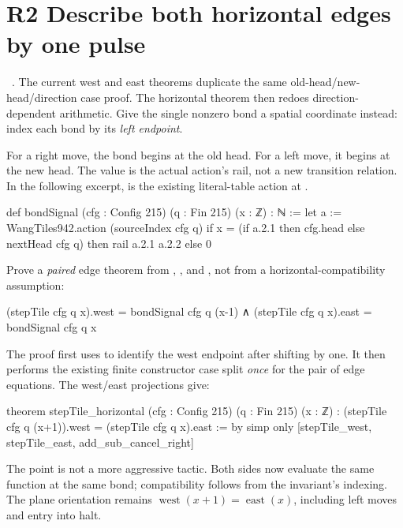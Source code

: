 \section{R2 Describe both horizontal edges by one pulse}

\ . The current west and east theorems duplicate the same old-head/new-head/direction case proof. The horizontal theorem then redoes direction-dependent arithmetic. Give the single nonzero bond a spatial coordinate instead: index each bond by its \emph{left endpoint}.

For a right move, the bond begins at the old head. For a left move, it begins at the new head. The value is the actual action's rail, not a new transition relation. In the following excerpt,  is the existing literal-table action at .

\begin{Lean}
def bondSignal (cfg : Config 215) (q : Fin 215) (x : ℤ) : ℕ :=
  let a := WangTiles942.action (sourceIndex cfg q)
  if x = (if a.2.1 then cfg.head else nextHead cfg q)
    then rail a.2.1 a.2.2 else 0
\end{Lean}

Prove a \emph{paired} edge theorem from , , and , not from a horizontal-compatibility assumption:

\begin{Lean}
  (stepTile cfg q x).west = bondSignal cfg q (x-1) ∧
    (stepTile cfg q x).east = bondSignal cfg q x
\end{Lean}

The proof first uses  to identify the west endpoint after shifting by one. It then performs the existing finite constructor case split \emph{once} for the pair of edge equations. The west/east projections give:

\begin{Lean}
theorem stepTile_horizontal (cfg : Config 215) (q : Fin 215) (x : ℤ) :
    (stepTile cfg q (x+1)).west = (stepTile cfg q x).east := by
  simp only [stepTile_west, stepTile_east, add_sub_cancel_right]
\end{Lean}

The point is not a more aggressive tactic. Both sides now evaluate the same function at the same bond; compatibility follows from the invariant's indexing. The plane orientation remains \(\operatorname{west}(x+1)=\operatorname{east}(x)\), including left moves and entry into halt.

